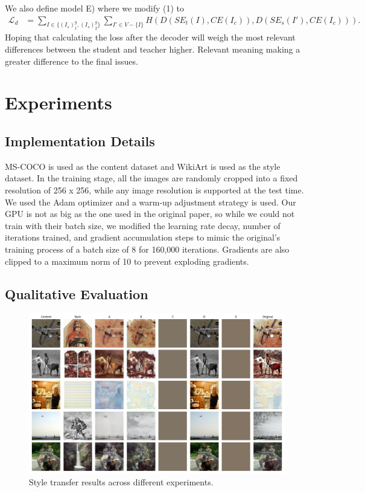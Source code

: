 \documentclass{article}
\begin{document}
We also define model E) where we modify (1) to
\begin{align}
	\mathcal L_d &= \sum_{I \in \{(I_s)^g_1, (I_s)^g_2\}} \sum_{I' \in V - \{ I \}} H(D(SE_t(I), CE(I_c)), D(SE_s(I'), CE(I_c))).
\end{align}
Hoping that calculating the loss after the decoder will weigh the most relevant differences between the student and teacher higher. Relevant meaning making a greater difference to the final issues.

\section{Experiments}

\subsection{Implementation Details}

MS-COCO \cite{COCO} is used as the content dataset and WikiArt \cite{Wikiart} is used as the style dataset. In the training stage,
all the images are randomly cropped into a fixed resolution of 256 x 256, while any image resolution is supported at the test time. We used the Adam optimizer \cite{Adam} and a warm-up adjustment strategy \cite{Warmup} is used. Our GPU is not as big as the one used in the original paper, so while we could not train with their batch size, we modified the learning rate decay, number of iterations trained, and gradient accumulation steps to mimic the original's training process of a batch size of 8 for 160,000 iterations. Gradients are also clipped to a maximum norm of 10 to prevent exploding gradients.

\subsection{Qualitative Evaluation}

\begin{figure}
\includegraphics[width=14cm]{comparison}	
\caption{Style transfer results across different experiments.}
\label{comparison}
\end{figure}
\end{document}
